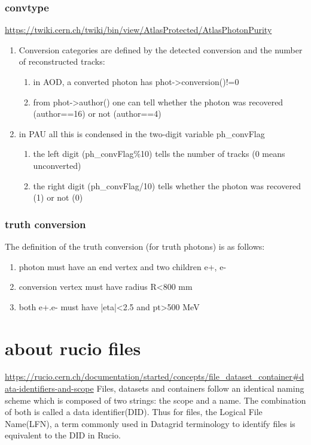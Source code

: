 \documentclass{ctexart}
\begin{document}
\subsubsection{convtype}
\url{https://twiki.cern.ch/twiki/bin/view/AtlasProtected/AtlasPhotonPurity}
\begin{enumerate}
    \item Conversion categories are defined by the detected conversion and the number of reconstructed tracks:\\
    \begin{enumerate}
        \item in AOD, a converted photon has phot->conversion()!=0
        \item from phot->author() one can tell whether the photon was recovered (author==16) or not (author==4)
    \end{enumerate}
    \item in PAU all this is condensed in the two-digit variable ph\_convFlag
    \begin{enumerate}
        \item the left digit (ph\_convFlag\%10) tells the number of tracks (0 means unconverted)
        \item the right digit (ph\_convFlag/10) tells whether the photon was recovered (1) or not (0)
    \end{enumerate}
\end{enumerate}

\subsubsection{truth conversion}
The definition of the truth conversion (for truth photons) is as follows:
\begin{enumerate}
    \item photon must have an end vertex and two children e+, e-
    \item conversion vertex must have radius R<800 mm
    \item both e+.e- must have |eta|<2.5 and pt>500 MeV
\end{enumerate}
\section{about rucio files}
\url{https://rucio.cern.ch/documentation/started/concepts/file_dataset_container#data-identifiers-and-scope}
Files, datasets and containers follow an identical naming scheme which is composed of two strings: the scope and a name. The combination of both is called a data identifier(DID). Thus for files, the Logical File Name(LFN), a term  commonly used in Datagrid terminology to identify files is  equivalent to the DID in Rucio.\\
\end{document}
